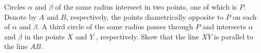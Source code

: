 Circles $\alpha$ and $\beta$ of the same radius intersect in two points, one of which is $P$. Denote by $A$ and $B$,  respectively, the points diametrically opposite to $P$ on each of $\alpha$ and $\beta$. A third circle of the same radius passes through $P$ and intersects $\alpha$ and $\beta$ in the points $X$ and $Y$ , respectively. Show that the line $XY$ is parallel to the line $AB$.
